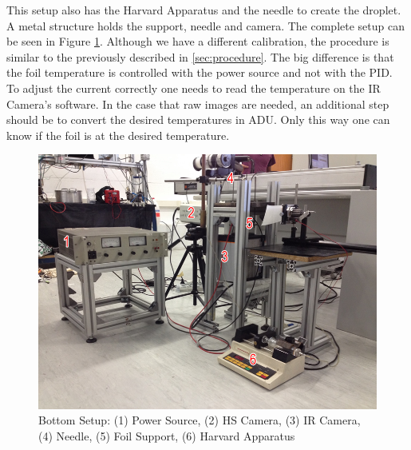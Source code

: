 \par This setup also has the Harvard Apparatus and the needle to create the droplet. A metal structure holds the support, needle and camera. The complete setup can be seen in Figure \ref{fig:setup2}. Although we have a different calibration, the procedure is similar to the previously described in \ref{sec:procedure}. The big difference is that the foil temperature is controlled with the power source and not with the PID. To adjust the current correctly one needs to read the temperature on the IR Camera's software. In the case that raw images are needed, an additional step should be to convert the desired temperatures in ADU. Only this way one can know if the foil is at the desired temperature.

\begin{figure}[h]
\centering
\includegraphics[width=0.9\linewidth]{Figures/3.Chapter/setup2.png}
\caption{Bottom Setup: (1) Power Source, (2) HS Camera, (3) IR Camera, (4) Needle, (5) Foil Support, (6) Harvard Apparatus}
\label{fig:setup2}
\end{figure}